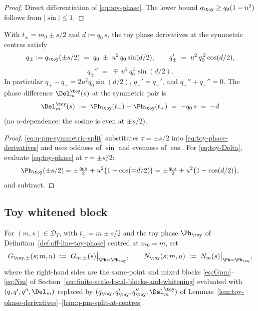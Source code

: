 \begin{proof}
Direct differentiation of \eqref{eq:toy-phase}.  The lower bound
\(q_\toy\ge q_0(1-u^2)\) follows from \(|\sin|\le 1\).
\end{proof}

\begin{lemma}
\label{lem:q-pm-split-at-centres}
With \(t_\pm=m_0\pm s/2\) and \(d:=q_0\,s\), the toy phase derivatives
at the symmetric centres satisfy
\begin{equation}
\label{eq:q-pm-symmetric-split}
q_\pm:=q_\toy(\pm s/2)\;=\;q_0\;\pm\;u^2\,q_0\sin(d/2),
\qquad
q_\pm'\;=\;u^2\,q_0^{\,2}\cos(d/2),
\end{equation}
\[
q_\pm''\;=\;\mp\,u^2\,q_0^{\,3}\sin(d/2).
\]
In particular \(q_+ - q_- = 2 u^2 q_0\sin(d/2)\),
\(q_+' = q_-'\), and \(q_+''+q_-'' = 0\).  The phase difference
\(\Del_m^\toy(s)\) at the symmetric pair is
\begin{equation}
\label{eq:toy-Delta}
\Del_m^\toy(s)\;:=\;\Ph_\toy(t_-)-\Ph_\toy(t_+)\;=\;-q_0\,s\;=\;-d
\end{equation}
(no \(u\)-dependence: the cosine is even at \(\pm s/2\)).
\end{lemma}

\begin{proof}
\eqref{eq:q-pm-symmetric-split} substitutes \(\tau=\pm s/2\) into
\eqref{eq:toy-phase-derivatives} and uses oddness of \(\sin\) and
evenness of \(\cos\).  For \eqref{eq:toy-Delta}, evaluate
\eqref{eq:toy-phase} at \(\tau=\pm s/2\):
\[
\Ph_\toy(\pm s/2)
=\pm\tfrac{q_0 s}{2}
+u^2\bigl(1-\cos(\mp d/2)\bigr)
=\pm\tfrac{q_0 s}{2}
+u^2\bigl(1-\cos(d/2)\bigr),
\]
and subtract.
\end{proof}

\subsection{Toy whitened block}
\label{subsec:toy-whitened-block}

\begin{definition}
\label{def:toy-finite-blocks}
For \((m,s)\in\mathcal D_T\), with \(t_\pm=m\pm s/2\) and the toy phase
\(\Ph_\toy\) of Definition~\ref{def:off-line-toy-phase} centred at
\(m_0=m\), set
\begin{equation}
\label{eq:toy-G-N}
G_{\toy,\pm}(s;m,u)\;:=\;G_{m,\pm}(s)\big|_{\Ph=\Ph_\toy},
\qquad
N_\toy(s;m,u)\;:=\;N_m(s)\big|_{\Ph=\Ph_\toy},
\end{equation}
where the right-hand sides are the same-point and mixed blocks
\eqref{eq:Gpm}--\eqref{eq:Nm} of
Section~\ref{sec:finite-scale-local-blocks-and-whitening} evaluated
with \((q,q',q'',\Del_m)\) replaced by
\((q_\toy,q_\toy',q_\toy'',\Del_m^\toy)\) of
Lemmas~\ref{lem:toy-phase-derivatives}--\ref{lem:q-pm-split-at-centres}.
\end{definition}

